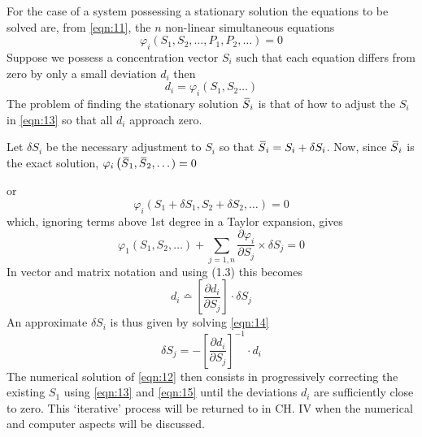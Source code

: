For the case of a system possessing a stationary solution the equations to be solved are, from \eqref{eqn:11}, the $n$ non-linear simultaneous equations
%
\begin{equation}
\varphi_{i}\left(S_{1}, S_{2}, \ldots, P_{1}, P_{2}, \ldots \right)=0
\label{eqn:12}
\end{equation}
%
Suppose we possess a concentration vector $S_{i}$ such that each equation differs from zero by only a small deviation $d_{i}$ then
%
\begin{equation}
d_{i} = \varphi_{i}\left(S_{1}, S_{2} \ldots\right)
\label{eqn:13}
\end{equation}
%
The problem of finding the stationary solution $\,\overline{\!{S}}_{i}$ is that of how to adjust the $S_{i}$ in \eqref{eqn:13} so that all $d_{i}$ approach zero.

Let $\delta S_{i}$ be the necessary adjustment to $S_{i}$ so that $\,\overline{\!{S}}_{i} = S_{i} + \delta S_{i}$. Now, since $\,\overline{\!{S}}_{i}$ is the exact solution, $\varphi_{i}\left(\olsi{S}_{1}, \olsi{S}_{2}, \ldots\right.)=0$

or
%
$$
\varphi_{i}\left(S_{1} + \delta S_{1}, S_{2} + \delta {S_{2}}, \ldots \right) = 0
$$
%
which, ignoring terms above 1st degree in a Taylor expansion, gives
%
$$
\varphi_{1}\left(S_{1}, S_{2}, \ldots\right) + \sum_{j=1,n} \frac{\partial \varphi_{i}}{\partial S_{j}} \times \delta S_{j}=0
$$
%
In vector and matrix notation and using (1.3) this becomes
%
\begin{equation}
d_{i} \bumpeq \left[\frac{\partial d_{i}}{\partial S_{j}}\right] \cdot \delta S_{j}
\label{eqn:14}
\end{equation}
%
An approximate $\delta S_{i}$ is thus given by solving \eqref{eqn:14}
%
\begin{equation}
\delta S_{j} = -\left[\frac{\partial d_{i}}{\partial S_{j}}\right]^{-1} \cdot d_{i}
\label{eqn:15}
\end{equation}
%
The numerical solution of \eqref{eqn:12} then consists in progressively correcting the existing $S_{1}$ using \eqref{eqn:13} and \eqref{eqn:15} until the deviations $d_{i}$ are sufficiently close to zero. This `iterative' process will be returned to in CH. IV when the numerical and computer aspects will be discussed.

